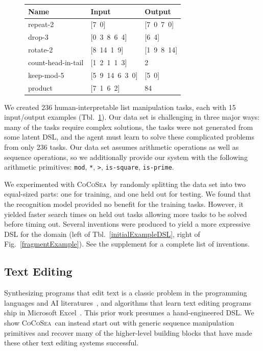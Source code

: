 \documentclass{article}
\newcommand{\system}{\textsc{CoCoSea}~}
\newcommand{\code}[1]{{\footnotesize\texttt{#1}}}
\begin{document}
\begin{figure}\centering
  \begin{tabular}{lll}
    \toprule
    Name & Input & Output \\\midrule
    repeat-2 & [7\, 0] & [7\, 0\, 7\, 0] \\
    drop-3 & [0\, 3\, 8\, 6\, 4] & [6\, 4] \\
    rotate-2 & [8\, 14\, 1\, 9] & [1\, 9\, 8\, 14] \\
    count-head-in-tail & [1\, 2\, 1\, 1\, 3] & 2 \\
    keep-mod-5 & [5\, 9\, 14\, 6\, 3\, 0] & [5\, 0] \\
    product & [7\, 1\, 6\, 2] & 84 \\
    \bottomrule
  \end{tabular}
  \label{listexamples}
\end{figure}
We created 236 human-interpretable list manipulation tasks, each with 15
input/output examples (Tbl.~\ref{listexamples}).
Our data set is challenging in three major ways: many of the tasks require
complex solutions, the tasks were not generated from some latent DSL, and
the agent must learn to solve these complicated problems from only 236
tasks.
Our data set assumes arithmetic operations as well as sequence operations,
so we additionally provide our system with the following arithmetic
primitives: \code{mod}, \code{*}, \code{>}, \code{is-square},
\code{is-prime}.

We experimented with \system by randomly splitting the data set into two
equal-sized parts: one for training, and one held out for testing.
We found that the recognition model provided no benefit for the training
tasks. However, it yielded faster search times on held out tasks allowing
more tasks to be solved before timing out.
Several inventions were produced to yield a more expressive DSL for the
domain (left of Tbl.~\ref{initialExampleDSL}, right of
Fig.~\ref{fragmentExample}). See the supplement for a complete list of
inventions.


\subsection{Text Editing}\label{textSection}
Synthesizing programs that edit text is a classic problem in the
programming languages and AI literatures~\cite{menon2013machine,lau2001programming},
and algorithms that learn text editing programs ship in Microsoft Excel~\cite{gulwani2011automating}.
This prior work presumes a hand-engineered DSL.
We show \system can instead start out with generic sequence manipulation
primitives and recover many of the higher-level building blocks that have
made these other text editing systems successful.
\end{document}
